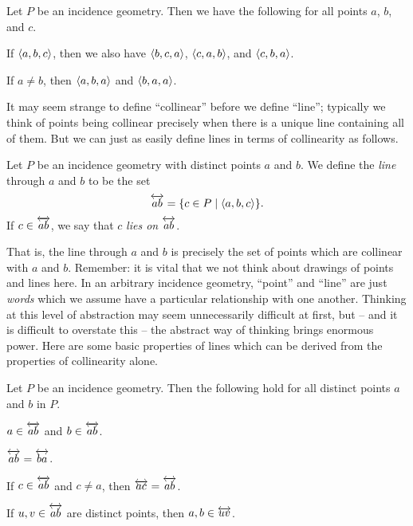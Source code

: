 \begin{prop}
Let \(P\) be an incidence geometry.
Then we have the following for all points \(a\), \(b\), and \(c\).
\begin{proplist}
\item If \(\langle a, b, c \rangle\), then we also have \(\langle b, c, a \rangle\), \(\langle c, a, b \rangle\), and \(\langle c, b, a \rangle\).
\item If \(a \neq b\), then \(\langle a, b, a \rangle\) and \(\langle b, a, a \rangle\).
\end{proplist}
\end{prop}

It may seem strange to define ``collinear'' before we define ``line''; typically we think of points being collinear precisely when there is a unique line containing all of them.
But we can just as easily define lines in terms of collinearity as follows.

\begin{dfn}[Line] \label{dfn:line}
Let \(P\) be an incidence geometry with distinct points \(a\) and \(b\).
We define the \emph{line} through \(a\) and \(b\) to be the set \[ \overleftrightarrow{ab} = \{ c \in P \mid \langle a, b, c \rangle \}. \]
If \(c \in \overleftrightarrow{ab}\), we say that \(c\) \emph{lies on} \(\overleftrightarrow{ab}\).
\end{dfn}

That is, the line through \(a\) and \(b\) is precisely the set of points which are collinear with \(a\) and \(b\).
Remember: it is vital that we not think about drawings of points and lines here.
In an arbitrary incidence geometry, ``point'' and ``line'' are just \emph{words} which we assume have a particular relationship with one another.
Thinking at this level of abstraction may seem unnecessarily difficult at first, but -- and it is difficult to overstate this -- the abstract way of thinking brings enormous power.
Here are some basic properties of lines which can be derived from the properties of collinearity alone.

\begin{prop}
Let \(P\) be an incidence geometry.
Then the following hold for all distinct points \(a\) and \(b\) in \(P\).
\begin{proplist}
\item \(a \in \overleftrightarrow{ab}\) and \(b \in \overleftrightarrow{ab}\).
\item \(\overleftrightarrow{ab} = \overleftrightarrow{ba}\).
\item If \(c \in \overleftrightarrow{ab}\) and \(c \neq a\), then \(\overleftrightarrow{ac} = \overleftrightarrow{ab}\).
\item If \(u,v \in \overleftrightarrow{ab}\) are distinct points, then \(a,b \in \overleftrightarrow{uv}\).
\end{proplist}
\end{prop}

